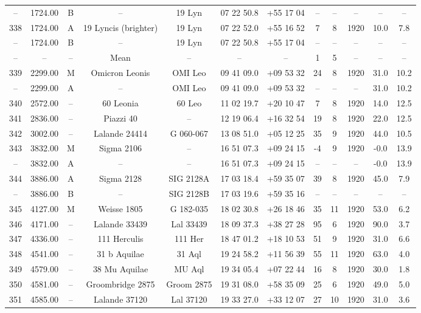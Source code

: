 \begin{table}
\begin{tabular}{cccccccccccc}
-- & 1724.00 & B & -- & 19 Lyn & 07 22 50.8 & +55 17 04 & -- & -- & -- & -- & -- \\
338 & 1724.00 & A & 19 Lyncis (brighter) & 19 Lyn & 07 22 52.0 & +55 16 52 & 7 & 8 & 1920 & 10.0 & 7.8 \\
-- & 1724.00 & B & -- & 19 Lyn & 07 22 50.8 & +55 17 04 & -- & -- & -- & -- & -- \\
-- & -- & -- & Mean & -- & -- & -- & 1 & 5 & -- & -- & -- \\
339 & 2299.00 & M & Omicron Leonis & OMI Leo & 09 41 09.0 & +09 53 32 & 24 & 8 & 1920 & 31.0 & 10.2 \\
-- & 2299.00 & A & -- & OMI Leo & 09 41 09.0 & +09 53 32 & -- & -- & -- & 31.0 & 10.2 \\
340 & 2572.00 & -- & 60 Leonia & 60 Leo & 11 02 19.7 & +20 10 47 & 7 & 8 & 1920 & 14.0 & 12.5 \\
341 & 2836.00 & -- & Piazzi 40 & -- & 12 19 06.4 & +16 32 54 & 19 & 8 & 1920 & 22.0 & 12.5 \\
342 & 3002.00 & -- & Lalande 24414 & G 060-067 & 13 08 51.0 & +05 12 25 & 35 & 9 & 1920 & 44.0 & 10.5 \\
343 & 3832.00 & M & Sigma 2106 & -- & 16 51 07.3 & +09 24 15 & -4 & 9 & 1920 & -0.0 & 13.9 \\
-- & 3832.00 & A & -- & -- & 16 51 07.3 & +09 24 15 & -- & -- & -- & -0.0 & 13.9 \\
344 & 3886.00 & A & Sigma 2128 & SIG 2128A & 17 03 18.4 & +59 35 07 & 39 & 8 & 1920 & 45.0 & 7.9 \\
-- & 3886.00 & B & -- & SIG 2128B & 17 03 19.6 & +59 35 16 & -- & -- & -- & -- & -- \\
345 & 4127.00 & M & Weisse 1805 & G 182-035 & 18 02 30.8 & +26 18 46 & 35 & 11 & 1920 & 53.0 & 6.2 \\
346 & 4171.00 & -- & Lalande 33439 & Lal 33439 & 18 09 37.3 & +38 27 28 & 95 & 6 & 1920 & 90.0 & 3.7 \\
347 & 4336.00 & -- & 111 Herculis & 111 Her & 18 47 01.2 & +18 10 53 & 51 & 9 & 1920 & 31.0 & 6.6 \\
348 & 4541.00 & -- & 31 b Aquilae & 31 Aql & 19 24 58.2 & +11 56 39 & 55 & 11 & 1920 & 63.0 & 4.0 \\
349 & 4579.00 & -- & 38 Mu Aquilae & MU Aql & 19 34 05.4 & +07 22 44 & 16 & 8 & 1920 & 30.0 & 1.8 \\
350 & 4581.00 & -- & Groombridge 2875 & Groom 2875 & 19 31 08.0 & +58 35 09 & 25 & 6 & 1920 & 49.0 & 5.0 \\
351 & 4585.00 & -- & Lalande 37120 & Lal 37120 & 19 33 27.0 & +33 12 07 & 27 & 10 & 1920 & 31.0 & 3.6 \\

\end{tabular}
\end{table}
